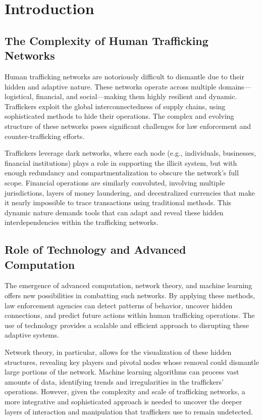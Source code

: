 \documentclass[%
 preprint, linenumbers,
 amsmath,amssymb,
 aps, physrev,
]{revtex4-2}
\begin{document}
\section{Introduction}

\subsection{The Complexity of Human Trafficking Networks} Human trafficking networks are notoriously difficult to dismantle due to their hidden and adaptive nature. These networks operate across multiple domains—logistical, financial, and social—making them highly resilient and dynamic. Traffickers exploit the global interconnectedness of supply chains, using sophisticated methods to hide their operations. The complex and evolving structure of these networks poses significant challenges for law enforcement and counter-trafficking efforts.

Traffickers leverage dark networks, where each node (e.g., individuals, businesses, financial institutions) plays a role in supporting the illicit system, but with enough redundancy and compartmentalization to obscure the network’s full scope. Financial operations are similarly convoluted, involving multiple jurisdictions, layers of money laundering, and decentralized currencies that make it nearly impossible to trace transactions using traditional methods. This dynamic nature demands tools that can adapt and reveal these hidden interdependencies within the trafficking networks.

\subsection{Role of Technology and Advanced Computation} The emergence of advanced computation, network theory, and machine learning offers new possibilities in combatting such networks. By applying these methods, law enforcement agencies can detect patterns of behavior, uncover hidden connections, and predict future actions within human trafficking operations. The use of technology provides a scalable and efficient approach to disrupting these adaptive systems.

Network theory, in particular, allows for the visualization of these hidden structures, revealing key players and pivotal nodes whose removal could dismantle large portions of the network. Machine learning algorithms can process vast amounts of data, identifying trends and irregularities in the traffickers' operations. However, given the complexity and scale of trafficking networks, a more integrative and sophisticated approach is needed to uncover the deeper layers of interaction and manipulation that traffickers use to remain undetected.
\end{document}
